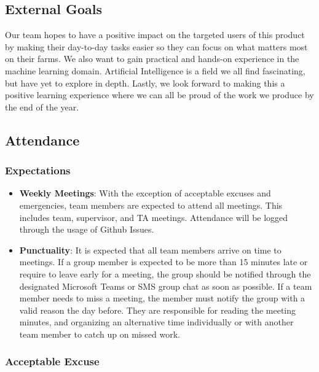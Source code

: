 \documentclass{article}
\begin{document}

\subsection*{External Goals}
Our team hopes to have a positive impact on the targeted users of this product by making their day-to-day tasks easier so they can focus on what matters most on their farms. We also want to gain practical and hands-on experience in the machine learning domain. Artificial Intelligence is a field we all find fascinating, but have yet to explore in depth. Lastly, we look forward to making this a positive learning experience where we can all be proud of the work we produce by the end of the year.

\subsection*{Attendance}

\subsubsection*{Expectations}

\begin{itemize}
  \item \textbf{Weekly Meetings}: With the exception of acceptable excuses and emergencies, team members are expected to attend all meetings. This includes team, supervisor, and TA meetings. Attendance will be logged through the usage of Github Issues. 
  \item \textbf{Punctuality}: It is expected that all team members arrive on time to meetings. If a group member is expected to be more than 15 minutes late or require to leave early for a meeting, the group should be notified through the designated Microsoft Teams or SMS group chat as soon as possible. If a team member needs to miss a meeting, the member must notify the group with a valid reason the day before. They are responsible for reading the meeting minutes, and organizing an alternative time individually or with another team member to catch up on missed work.
\end{itemize}

\subsubsection*{Acceptable Excuse}
\end{document}
